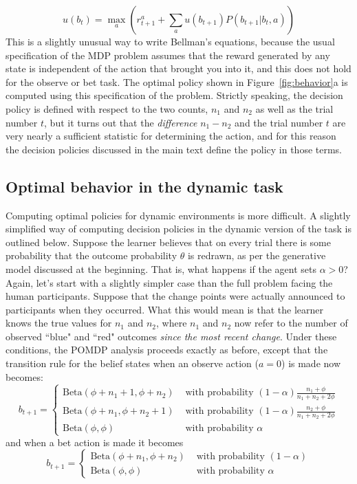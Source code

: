 \documentclass[authoryear]{elsarticle}
\begin{document}
$$
u(b_{t}) =  \max_{a} \left( r_{t+1}^a + \sum_{a} u(b_{t+1}) P(b_{t+1} | b_t, a) \right)
$$
This is a slightly unusual way to write Bellman's equations, because the usual specification of the MDP problem assumes that the reward generated by any state is independent of the action that brought you into it, and this does not hold for the observe or bet task. The optimal policy shown in Figure~\ref{fig:behavior}a is computed using this specification of the problem. Strictly speaking, the decision policy is defined with respect to the two counts, $n_1$ and $n_2$ as well as the trial number $t$, but it turns out that the {\it difference} $n_1 - n_2$ and the trial number $t$ are very nearly a sufficient statistic for determining the action, and for this reason the decision policies discussed in the main text define the policy in those terms.

\subsection{Optimal behavior in the dynamic task}

Computing optimal policies for dynamic environments is more difficult. A slightly simplified way of computing decision policies in the dynamic version of the task is outlined below. Suppose the learner believes that on every trial there is some probability that the outcome probability $\theta$ is redrawn, as per the generative model discussed at the beginning. That is, what happens if the agent sets $\alpha > 0$? Again, let's start with a slightly simpler case than the full problem facing the human participants. Suppose that the change points were actually announced to participants when they occurred. What this would mean is that the learner knows the true values for $n_1$ and $n_2$, where $n_1$ and $n_2$ now refer to the number of observed ``blue" and ``red" outcomes {\it since the most recent change}. Under these conditions, the POMDP analysis proceeds exactly as before, except that the transition rule for the belief states when an observe action ($a=0$) is made now becomes:
$$
b_{t+1} = \left\{
\begin{array}{rl}
\mbox{Beta}(\phi + n_1 + 1, \phi + n_2 ) & \mbox{ with probability } (1-\alpha) \frac{n_1 + \phi}{n_1+n_2+2\phi} \\ \mbox{Beta}(\phi + n_1, \phi + n_2 + 1 ) & \mbox{ with probability } (1-\alpha) \frac{n_2 + \phi}{n_1+n_2+2\phi} \\
\mbox{Beta}(\phi, \phi ) & \mbox{ with probability } \alpha
\end{array}
\right.
$$
and when a bet action is made it becomes
$$
b_{t+1} = \left\{
\begin{array}{rl}
\mbox{Beta}(\phi + n_1, \phi + n_2 ) & \mbox{ with probability } (1-\alpha) \\
\mbox{Beta}(\phi, \phi ) & \mbox{ with probability } \alpha
\end{array}
\right.
$$
\end{document}
